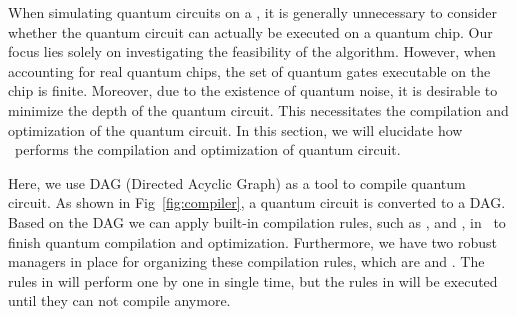 

When simulating quantum circuits on a \Simulator, it is generally unnecessary to consider whether the quantum circuit can actually be executed on a quantum chip. Our focus lies solely on investigating the feasibility of the algorithm. However, when accounting for real quantum chips, the set of quantum gates executable on the chip is finite. Moreover, due to the existence of quantum noise, it is desirable to minimize the depth of the quantum circuit. This necessitates the compilation and optimization of the quantum circuit. In this section, we will elucidate how \MindQuantum\ performs the compilation and optimization of quantum circuit.

Here, we use DAG (Directed Acyclic Graph) as a tool to compile quantum circuit. As shown in Fig~\ref{fig:compiler}, a quantum circuit is converted to a DAG. Based on the DAG we can apply built-in compilation rules, such as \BasicDecompose, \FullyNeighborCanceler and \GateReplacer, in \MindQuantum\ to finish quantum compilation and optimization. Furthermore, we have two robust managers in place for organizing these compilation rules, which are \SequentialCompiler and \KroneckerSeqCompiler. The rules in \SequentialCompiler will perform one by one in single time, but the rules in \KroneckerSeqCompiler will be executed until they can not compile anymore.

